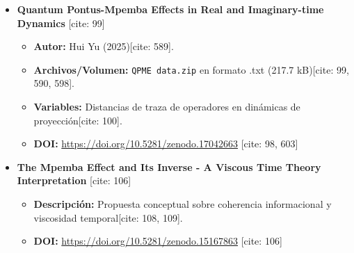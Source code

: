 \documentclass[11pt,a4paper]{article}
\begin{document}
\begin{itemize}
    \item \textbf{Quantum Pontus-Mpemba Effects in Real and Imaginary-time Dynamics} [cite: 99]
    \begin{itemize}
        \item \textbf{Autor:} Hui Yu (2025)[cite: 589].
        \item \textbf{Archivos/Volumen:} \texttt{QPME data.zip} en formato .txt (217.7 kB)[cite: 99, 590, 598].
        \item \textbf{Variables:} Distancias de traza de operadores en dinámicas de proyección[cite: 100].
        \item \textbf{DOI:} \url{https://doi.org/10.5281/zenodo.17042663} [cite: 98, 603]
    \end{itemize}
    
    \item \textbf{The Mpemba Effect and Its Inverse - A Viscous Time Theory Interpretation} [cite: 106]
    \begin{itemize}
        \item \textbf{Descripción:} Propuesta conceptual sobre coherencia informacional y viscosidad temporal[cite: 108, 109].
        \item \textbf{DOI:} \url{https://doi.org/10.5281/zenodo.15167863} [cite: 106]
    \end{itemize}
\end{itemize}
\end{document}
